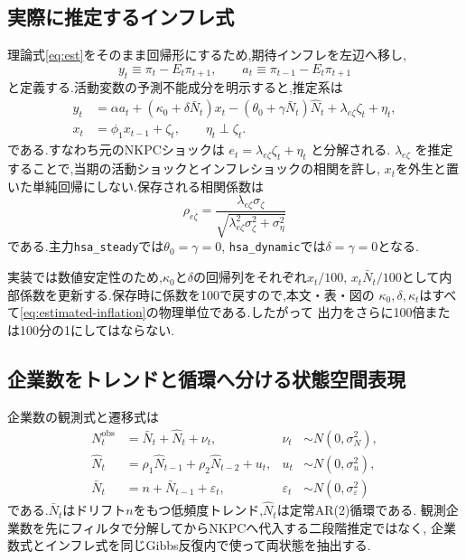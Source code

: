 \documentclass[11pt]{article}
\newcommand{\code}[1]{\texttt{#1}}
\newcommand{\kt}{\kappa_t}
\begin{document}
\subsection{実際に推定するインフレ式}
理論式\eqref{eq:est}をそのまま回帰形にするため,期待インフレを左辺へ移し,
\begin{equation}
y_t\equiv\pi_t-E_t\pi_{t+1},\qquad
a_t\equiv\pi_{t-1}-E_t\pi_{t+1}
\label{eq:ya-def}
\end{equation}
と定義する.活動変数の予測不能成分を明示すると,推定系は
\begin{align}
y_t
 &=\alpha a_t+(\kappa_0+\delta\bar N_t)x_t
   -(\theta_0+\gamma\bar N_t)\hat N_t
   +\lambda_{e\zeta}\zeta_t+\eta_t, \label{eq:estimated-inflation}\\
x_t&=\phi_1x_{t-1}+\zeta_t,\qquad
\eta_t\perp\zeta_t. \label{eq:activity-ar1}
\end{align}
である.すなわち元のNKPCショックは
$e_t=\lambda_{e\zeta}\zeta_t+\eta_t$ と分解される.
$\lambda_{e\zeta}$ を推定することで,当期の活動ショックとインフレショックの相関を許し,
$x_t$を外生と置いた単純回帰にしない.保存される相関係数は
\begin{equation}
\rho_{e\zeta}
=\frac{\lambda_{e\zeta}\sigma_\zeta}
{\sqrt{\lambda_{e\zeta}^2\sigma_\zeta^2+\sigma_\eta^2}}
\end{equation}
である.主力\code{hsa\_steady}では$\theta_0=\gamma=0$,
\code{hsa\_dynamic}では$\delta=\gamma=0$となる.

実装では数値安定性のため,$\kappa_0$と$\delta$の回帰列をそれぞれ$x_t/100$,
$x_t\bar N_t/100$として内部係数を更新する.保存時に係数を100で戻すので,本文・表・図の
$\kappa_0,\delta,\kt$はすべて\eqref{eq:estimated-inflation}の物理単位である.したがって
出力をさらに100倍または100分の1にしてはならない.

\subsection{企業数をトレンドと循環へ分ける状態空間表現}
企業数の観測式と遷移式は
\begin{align}
N_t^{\mathrm{obs}}&=\bar N_t+\hat N_t+\nu_t,
&\nu_t&\sim N(0,\sigma_N^2), \label{eq:N-measurement}\\
\hat N_t&=\rho_1\hat N_{t-1}+\rho_2\hat N_{t-2}+u_t,
&u_t&\sim N(0,\sigma_u^2), \label{eq:N-gap}\\
\bar N_t&=n+\bar N_{t-1}+\varepsilon_t,
&\varepsilon_t&\sim N(0,\sigma_\varepsilon^2) \label{eq:N-trend}
\end{align}
である.$\bar N_t$はドリフト$n$をもつ低頻度トレンド,$\hat N_t$は定常AR(2)循環である.
観測企業数を先にフィルタで分解してからNKPCへ代入する二段階推定ではなく,
企業数式とインフレ式を同じGibbs反復内で使って両状態を抽出する.
\end{document}
